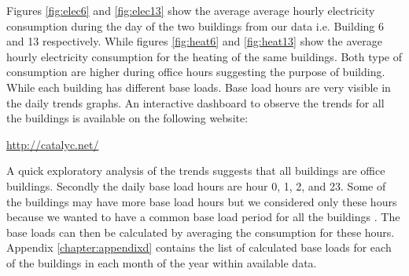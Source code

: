 Figures \ref{fig:elec6} and \ref{fig:elec13} show the average average hourly electricity consumption during the day of the two buildings from our data i.e. Building 6 and 13 respectively. While  figures \ref{fig:heat6} and \ref{fig:heat13} show the average hourly electricity consumption for the heating of the same buildings. Both type of consumption are higher during office hours suggesting the purpose of building.  While each building has different base loads. Base load hours are very visible in the daily trends graphs. An interactive dashboard to observe the trends for all the buildings is available on the following website:

\begin{center}

\url{http://catalyc.net/}\end{center}

A quick exploratory analysis of the trends suggests that all buildings are office buildings. Secondly the daily base load hours are hour 0, 1, 2, and 23. Some of the buildings may have more base load hours but we considered only these hours because we wanted to have a common base load period for all the buildings . The base loads can then be calculated by averaging the consumption for these hours. Appendix \ref{chapter:appendixd} contains the list of calculated base loads for each of the buildings in each month of the year within available data.


